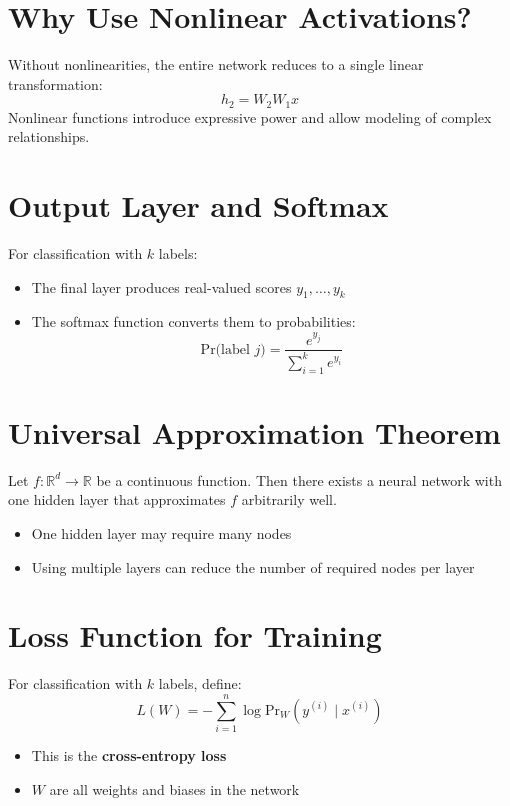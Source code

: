\documentclass[11pt]{article}
\begin{document}
\section{Why Use Nonlinear Activations?}

Without nonlinearities, the entire network reduces to a single linear transformation:
\[
h_2 = W_2 W_1 x
\]
Nonlinear functions introduce expressive power and allow modeling of complex relationships.

\section{Output Layer and Softmax}

For classification with $k$ labels:
\begin{itemize}
    \item The final layer produces real-valued scores $y_1, \ldots, y_k$
    \item The softmax function converts them to probabilities:
    \[
    \text{Pr(label } j) = \frac{e^{y_j}}{\sum_{i=1}^k e^{y_i}}
    \]
\end{itemize}

\section{Universal Approximation Theorem}

Let $f: \mathbb{R}^d \to \mathbb{R}$ be a continuous function. Then there exists a neural network with one hidden layer that approximates $f$ arbitrarily well.

\begin{itemize}
    \item One hidden layer may require many nodes
    \item Using multiple layers can reduce the number of required nodes per layer
\end{itemize}

\section{Loss Function for Training}

For classification with $k$ labels, define:
\[
L(W) = -\sum_{i=1}^n \log \text{Pr}_W(y^{(i)} \mid x^{(i)})
\]

\begin{itemize}
    \item This is the \textbf{cross-entropy loss}
    \item $W$ are all weights and biases in the network
\end{itemize}
\end{document}
